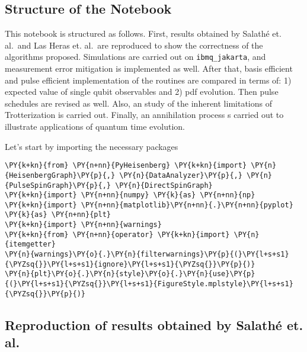     \hypertarget{structure-of-the-notebook}{%
\subsection{Structure of the Notebook}\label{structure-of-the-notebook}}

This notebook is structured as follows. First, results obtained by
Salathé et. al.~and Las Heras et. al.~are reproduced to show the
correctness of the algorithms proposed. Simulations are carried out on
\texttt{ibmq\_jakarta}, and measurement error mitigation is implemented
as well. After that, basis efficient and pulse efficient implementation
of the routines are compared in terms of: 1) expected value of single
qubit observables and 2) pdf evolution. Then pulse schedules are revised
as well. Also, an study of the inherent limitations of Trotterization is
carried out. Finally, an annihilation process s carried out to
illustrate applications of quantum time evolution.

Let's start by importing the necessary packages

    \begin{tcolorbox}[breakable, size=fbox, boxrule=1pt, pad at break*=1mm,colback=cellbackground, colframe=cellborder]
\begin{Verbatim}[commandchars=\\\{\}]
\PY{k+kn}{from} \PY{n+nn}{PyHeisenberg} \PY{k+kn}{import} \PY{n}{HeisenbergGraph}\PY{p}{,} \PY{n}{DataAnalyzer}\PY{p}{,} \PY{n}{PulseSpinGraph}\PY{p}{,} \PY{n}{DirectSpinGraph}
\PY{k+kn}{import} \PY{n+nn}{numpy} \PY{k}{as} \PY{n+nn}{np}
\PY{k+kn}{import} \PY{n+nn}{matplotlib}\PY{n+nn}{.}\PY{n+nn}{pyplot} \PY{k}{as} \PY{n+nn}{plt}
\PY{k+kn}{import} \PY{n+nn}{warnings}
\PY{k+kn}{from} \PY{n+nn}{operator} \PY{k+kn}{import} \PY{n}{itemgetter}
\PY{n}{warnings}\PY{o}{.}\PY{n}{filterwarnings}\PY{p}{(}\PY{l+s+s1}{\PYZsq{}}\PY{l+s+s1}{ignore}\PY{l+s+s1}{\PYZsq{}}\PY{p}{)}
\PY{n}{plt}\PY{o}{.}\PY{n}{style}\PY{o}{.}\PY{n}{use}\PY{p}{(}\PY{l+s+s1}{\PYZsq{}}\PY{l+s+s1}{FigureStyle.mplstyle}\PY{l+s+s1}{\PYZsq{}}\PY{p}{)}
\end{Verbatim}
\end{tcolorbox}

    \hypertarget{reproduction-of-results-obtained-by-salathuxe9-et.-al.}{%
\subsection{Reproduction of results obtained by Salathé et.
al.}\label{reproduction-of-results-obtained-by-salathuxe9-et.-al.}}

